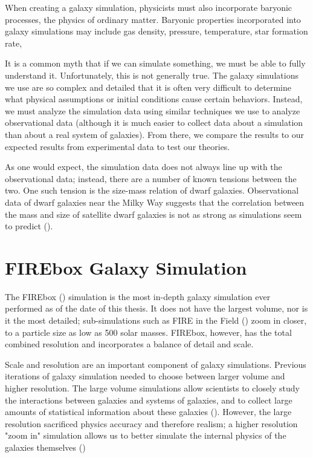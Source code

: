 When creating a galaxy simulation, physicists must also incorporate baryonic processes, the physics of ordinary matter. Baryonic properties incorporated into galaxy simulations may include gas density, pressure, temperature, star formation rate,


It is a common myth that if we can simulate something, we must be able to fully understand it. Unfortunately, this is not generally true. The galaxy simulations we use are so complex and detailed that it is often very difficult to determine what physical assumptions or initial conditions cause certain behaviors. Instead, we must analyze the simulation data using similar techniques we use to analyze observational data (although it is much easier to collect data about a simulation than about a real system of galaxies). From there, we compare the results to our expected results from experimental data to test our theories.

As one would expect, the simulation data does not always line up with the observational data; instead, there are a number of known tensions between the two. One such tension is the size-mass relation of dwarf galaxies. Observational data of dwarf galaxies near the Milky Way suggests that the correlation between the mass and size of satellite dwarf galaxies is not as strong as simulations seem to predict (\cite{salesBaryonicSolutionsChallenges2022}). 


\section{FIREbox Galaxy Simulation}
The FIREbox (\cite{feldmannFIREboxSimulatingGalaxies2022}) simulation is the most in-depth galaxy simulation ever performed as of the date of this thesis. It does not have the largest volume, nor is it the most detailed; sub-simulations such as FIRE in the Field (\cite{fittsFireFieldSimulating2017}) zoom in closer, to a particle size as low as 500 solar masses. FIREbox, however, has the total combined resolution and incorporates a balance of detail and scale.

Scale and resolution are an important component of galaxy simulations. Previous iterations of galaxy simulation needed to choose between larger volume and higher resolution. The large volume simulations allow scientists to closely study the interactions between galaxies and systems of galaxies, and to collect large amounts of statistical information about these galaxies (\cite{feldmannFIREboxSimulatingGalaxies2022}). However, the large resolution sacrificed physics accuracy and therefore realism; a higher resolution "zoom in" simulation allows us to better simulate the internal physics of the galaxies themselves (\cite{feldmannFIREboxSimulatingGalaxies2022})



